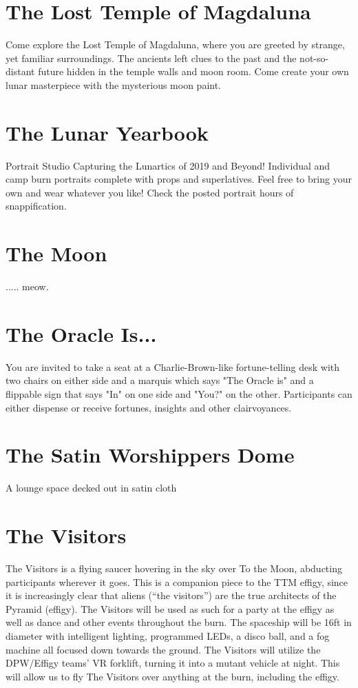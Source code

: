 \section*{The Lost Temple of Magdaluna }
Come explore the Lost Temple of Magdaluna, where you are greeted by strange, yet familiar surroundings. The ancients left clues to the past and the not-so-distant future hidden in the temple walls and moon room. Come create your own lunar masterpiece with the mysterious moon paint.  


\section*{The Lunar Yearbook}
Portrait Studio Capturing the Lunartics of 2019 and Beyond! Individual and camp burn portraits complete with props and superlatives. Feel free to bring your own and wear whatever you like! Check the posted portrait hours of snappification. 


\section*{The Moon}
..... meow.


\section*{The Oracle Is...}
You are invited to take a seat at a Charlie-Brown-like fortune-telling desk with two chairs on either side and a marquis which says "The Oracle is" and a flippable sign that says "In" on one side and "You?" on the other.   Participants can either dispense or receive fortunes, insights and other clairvoyances. 


\section*{The Satin Worshippers Dome}
A lounge space decked out in satin cloth 

\section*{The Visitors}
The Visitors is a flying saucer hovering in the sky over To the Moon, abducting participants wherever it goes. This is a companion piece to the TTM effigy, since it is increasingly clear that aliens (``the visitors'') are the true architects of the Pyramid (effigy). The Visitors will be used as such for a party at the effigy as well as dance and other events throughout the burn. The spaceship will be 16ft in diameter with intelligent lighting, programmed LEDs, a disco ball, and a fog machine all focused down towards the ground. The Visitors will utilize the DPW/Effigy teams' VR forklift, turning it into a mutant vehicle at night. This will allow us to fly The Visitors over anything at the burn, including the effigy.


